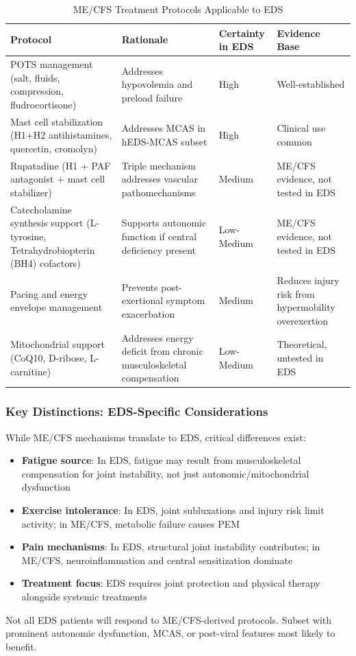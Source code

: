 \begin{table}[h]
\centering
\caption{ME/CFS Treatment Protocols Applicable to EDS}
\label{tab:eds-treatments}
\begin{tabular}{p{4cm}p{4cm}p{3cm}p{3cm}}
\toprule
\textbf{Protocol} & \textbf{Rationale} & \textbf{Certainty in EDS} & \textbf{Evidence Base} \\
\midrule
POTS management (salt, fluids, compression, fludrocortisone) & Addresses hypovolemia and preload failure & High & Well-established \\
\addlinespace
Mast cell stabilization (H1+H2 antihistamines, quercetin, cromolyn) & Addresses MCAS in hEDS-MCAS subset & High & Clinical use common \\
\addlinespace
Rupatadine (H1 + PAF antagonist + mast cell stabilizer) & Triple mechanism addresses vascular pathomechanisms & Medium & ME/CFS evidence, not tested in EDS \\
\addlinespace
Catecholamine synthesis support (L-tyrosine, Tetrahydrobiopterin (BH4) cofactors) & Supports autonomic function if central deficiency present & Low-Medium & ME/CFS evidence, not tested in EDS \\
\addlinespace
Pacing and energy envelope management & Prevents post-exertional symptom exacerbation & Medium & Reduces injury risk from hypermobility overexertion \\
\addlinespace
Mitochondrial support (CoQ10, D-ribose, L-carnitine) & Addresses energy deficit from chronic musculoskeletal compensation & Low-Medium & Theoretical, untested in EDS \\
\bottomrule
\end{tabular}
\end{table}

\subsubsection{Key Distinctions: EDS-Specific Considerations}

\begin{warning}
\label{warn:eds-distinctions}
While ME/CFS mechanisms translate to EDS, critical differences exist:
\begin{itemize}
    \item \textbf{Fatigue source}: In EDS, fatigue may result from musculoskeletal compensation for joint instability, not just autonomic/mitochondrial dysfunction
    \item \textbf{Exercise intolerance}: In EDS, joint subluxations and injury risk limit activity; in ME/CFS, metabolic failure causes PEM
    \item \textbf{Pain mechanisms}: In EDS, structural joint instability contributes; in ME/CFS, neuroinflammation and central sensitization dominate
    \item \textbf{Treatment focus}: EDS requires joint protection and physical therapy alongside systemic treatments
\end{itemize}

Not all EDS patients will respond to ME/CFS-derived protocols. Subset with prominent autonomic dysfunction, MCAS, or post-viral features most likely to benefit.
\end{warning}

